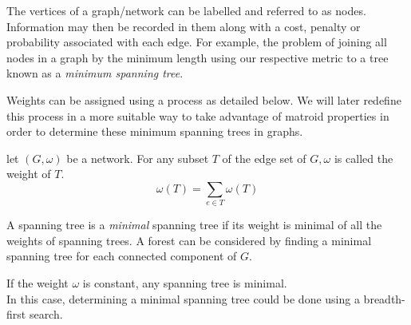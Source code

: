 \documentclass[../main.tex]{subfiles}
\begin{document}
\noindent The vertices of a graph/network can be labelled and referred to as nodes. Information may then be recorded in them along with a cost, penalty or probability associated with each edge. For example, the problem of joining all nodes in a graph by the minimum length using our respective metric to a tree known as a \textit{minimum spanning tree}.

\noindent Weights can be assigned using a process as detailed below. We will later redefine this process in a more suitable way to take advantage of matroid properties in order to determine these minimum spanning trees in graphs.
\begin{defn}
let $(G,\omega)$ be a network. For any subset $T$ of the edge set of $G, \omega$ is called the weight of $T.$\\
\begin{equation}
\omega (T) = \displaystyle\sum_{e \in T} \omega (T)
\end{equation}
\end{defn}

\begin{defn}
A spanning tree is a \textit{minimal} spanning tree if its weight is minimal of all the weights of spanning trees.
\noindent A forest can be considered by finding a minimal spanning tree for each connected component of $G.$
\end{defn}

\begin{rem}
If the weight $\omega$ is constant, any spanning tree is minimal.\\
\noindent In this case, determining a minimal spanning tree could be done using a breadth-first search.
\end{rem}

 
\end{document}
